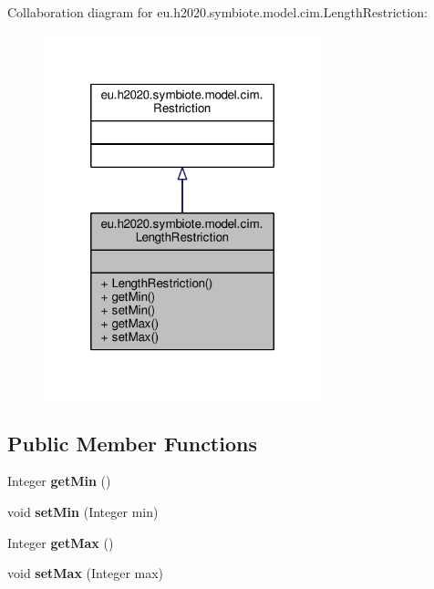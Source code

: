 Collaboration diagram for eu.\+h2020.\+symbiote.\+model.\+cim.\+Length\+Restriction\+:\nopagebreak
\begin{figure}[H]
\begin{center}
\leavevmode
\includegraphics[width=228pt]{classeu_1_1h2020_1_1symbiote_1_1model_1_1cim_1_1LengthRestriction__coll__graph}
\end{center}
\end{figure}
\subsection*{Public Member Functions}
\begin{DoxyCompactItemize}
\item 
\mbox{\label{classeu_1_1h2020_1_1symbiote_1_1model_1_1cim_1_1LengthRestriction_a45fbccf2d09db36baefe19d798fcb83c}} 
Integer {\bfseries get\+Min} ()
\item 
\mbox{\label{classeu_1_1h2020_1_1symbiote_1_1model_1_1cim_1_1LengthRestriction_afa1740aa87cc963493da45b8673622de}} 
void {\bfseries set\+Min} (Integer min)
\item 
\mbox{\label{classeu_1_1h2020_1_1symbiote_1_1model_1_1cim_1_1LengthRestriction_ae170ca5d8e08fa9f82ce8874d49b053f}} 
Integer {\bfseries get\+Max} ()
\item 
\mbox{\label{classeu_1_1h2020_1_1symbiote_1_1model_1_1cim_1_1LengthRestriction_a85e3059f5b42cd2f746e7d25e36d694e}} 
void {\bfseries set\+Max} (Integer max)
\end{DoxyCompactItemize}


